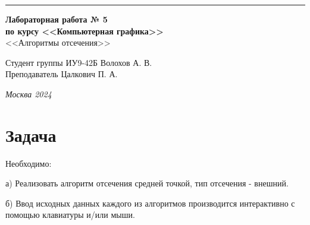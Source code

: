 \documentclass[a4paper, 14pt]{extarticle}
\begin{document}
\begin{titlepage}
\vspace*{-16pt}
\hspace{30pt}\rule{0.866\textwidth}{0.4pt}
  
\vspace{11em}

\begin{center}
\Large {\bf Лабораторная работа № 5} \\
\large {\bf по курсу <<Компьютерная графика>>} \\
\large <<Алгоритмы отсечения>>
\end{center}\normalsize

\vspace{8em}


\begin{flushright}
  {Студент группы ИУ9-42Б Волохов А. В.\hspace*{15pt} \\
  \vspace{2ex}
  Преподаватель Цалкович П. А.\hspace*{15pt}}
\end{flushright}

\bigskip

\vfill


\begin{center}
\textsl{Москва 2024}
\end{center}
\end{titlepage}

\renewcommand{\ttdefault}{pcr}

\setlength{\tabcolsep}{3pt}
\newpage
\setcounter{page}{2}

\section{Задача}\label{Sect::task}
Необходимо:
\par
а) Реализовать алгоритм отсечения средней точкой, тип отсечения - внешний.
\par
б) Ввод исходных данных каждого из алгоритмов производится интерактивно с помощью
клавиатуры и/или мыши.
\end{document}
